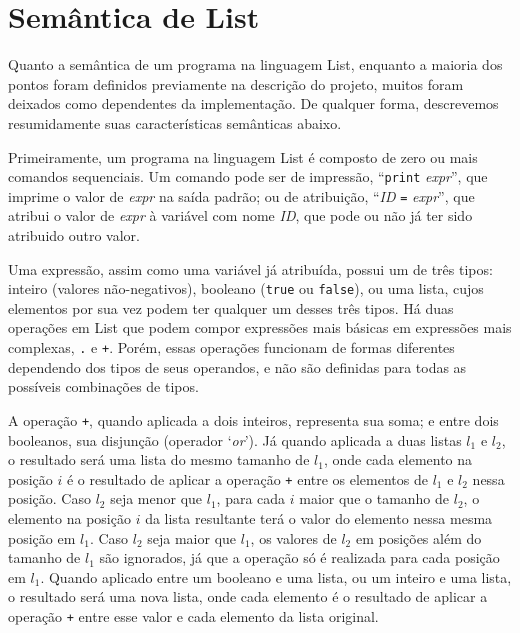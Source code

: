\documentclass{article}
\begin{document}
\section{Semântica de List}
\label{sec:semantica}
Quanto a semântica de um programa na linguagem List, enquanto a maioria dos pontos foram definidos previamente na descrição do projeto, muitos foram deixados como dependentes da implementação. De qualquer forma, descrevemos resumidamente suas características semânticas abaixo.

Primeiramente, um programa na linguagem List é composto de zero ou mais comandos sequenciais. Um comando pode ser de impressão, ``\texttt{print} \textit{expr}'', que imprime o valor de \textit{expr} na saída padrão; ou de atribuição, ``\textit{ID} \texttt{=} \textit{expr}'', que atribui o valor de \textit{expr} à variável com nome \textit{ID}, que pode ou não já ter sido atribuido outro valor.

Uma expressão, assim como uma variável já atribuída, possui um de três tipos: inteiro (valores não-negativos), booleano (\texttt{true} ou \texttt{false}), ou uma lista, cujos elementos por sua vez podem ter qualquer um desses três tipos. Há duas operações em List que podem compor expressões mais básicas em expressões mais complexas, \texttt{.} e \texttt{+}. Porém, essas operações funcionam de formas diferentes dependendo dos tipos de seus operandos, e não são definidas para todas as possíveis combinações de tipos.

A operação \texttt{+}, quando aplicada a dois inteiros, representa sua soma; e entre dois booleanos, sua disjunção (operador `\textit{or}'). Já quando aplicada a duas listas $l_1$ e $l_2$, o resultado será uma lista do mesmo tamanho de $l_1$, onde cada elemento na posição $i$ é o resultado de aplicar a operação \texttt{+} entre os elementos de $l_1$ e $l_2$ nessa posição. Caso $l_2$ seja menor que $l_1$, para cada $i$ maior que o tamanho de $l_2$, o elemento na posição $i$ da lista resultante terá o valor do elemento nessa mesma posição em $l_1$. Caso $l_2$ seja maior que $l_1$, os valores de $l_2$ em posições além do tamanho de $l_1$ são ignorados, já que a operação só é realizada para cada posição em $l_1$. Quando aplicado entre um booleano e uma lista, ou um inteiro e uma lista, o resultado será uma nova lista, onde cada elemento é o resultado de aplicar a operação \texttt{+} entre esse valor e cada elemento da lista original.
\end{document}
